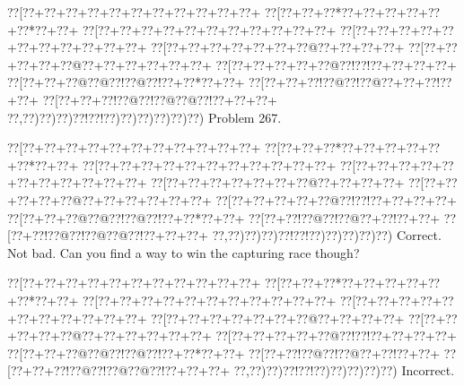 \documentclass[a5paper]{article}
\begin{document}
\begin{center}
{\goo
\0??[\0??+\0??+\0??+\0??+\0??+\0??+\0??+\0??+\0??+\0??+\0??+
\0??[\0??+\0??+\0??*\0??+\0??+\0??+\0??+\0??+\0??*\0??+\0??+
\0??[\0??+\0??+\0??+\0??+\0??+\0??+\0??+\0??+\0??+\0??+\0??+
\0??[\0??+\0??+\0??+\0??+\0??+\0??+\0??+\0??+\0??+\0??+\0??+
\0??[\0??+\0??+\0??+\0??+\0??+\0??+\0??@\0??+\0??+\0??+\0??+
\0??[\0??+\0??+\0??+\0??+\0??@\0??+\0??+\0??+\0??+\0??+\0??+
\0??[\0??+\0??+\0??+\0??+\0??@\0??!\0??!\0??+\0??+\0??+\0??+
\0??[\0??+\0??+\0??@\0??@\0??!\0??@\0??!\0??+\0??*\0??+\0??+
\0??[\0??+\0??+\0??!\0??@\0??!\0??@\0??+\0??+\0??!\0??+\0??+
\0??[\0??+\0??+\0??!\0??@\0??!\0??@\0??@\0??!\0??+\0??+\0??+
\0??,\0??)\0??)\0??)\0??!\0??!\0??)\0??)\0??)\0??)\0??)\0??)
}
Problem 267.

\end{center}
\begin{center}
{\goo
\0??[\0??+\0??+\0??+\0??+\0??+\0??+\0??+\0??+\0??+\0??+\0??+
\0??[\0??+\0??+\0??*\0??+\0??+\0??+\0??+\0??+\0??*\0??+\0??+
\0??[\0??+\0??+\0??+\0??+\0??+\0??+\0??+\0??+\0??+\0??+\0??+
\0??[\0??+\0??+\0??+\0??+\0??+\0??+\0??+\0??+\0??+\0??+\0??+
\0??[\0??+\0??+\0??+\0??+\0??+\0??+\0??@\0??+\0??+\0??+\0??+
\0??[\0??+\0??+\0??+\0??+\0??@\0??+\0??+\0??+\0??+\0??+\0??+
\0??[\0??+\0??+\0??+\0??+\0??@\0??!\0??!\0??+\0??+\0??+\0??+
\0??[\0??+\0??+\0??@\0??@\0??!\0??@\0??!\0??+\0??*\0??+\0??+
\0??[\0??+\0??!\0??@\0??!\0??@\0??+\0??!\0??+\0??+
\0??[\0??+\0??!\0??@\0??!\0??@\0??@\0??!\0??+\0??+\0??+
\0??,\0??)\0??)\0??)\0??!\0??!\0??)\0??)\0??)\0??)\0??)
}
Correct. Not bad. Can you find a way to win the capturing race though?

\end{center}
\begin{center}
{\goo
\0??[\0??+\0??+\0??+\0??+\0??+\0??+\0??+\0??+\0??+\0??+\0??+
\0??[\0??+\0??+\0??*\0??+\0??+\0??+\0??+\0??+\0??*\0??+\0??+
\0??[\0??+\0??+\0??+\0??+\0??+\0??+\0??+\0??+\0??+\0??+\0??+
\0??[\0??+\0??+\0??+\0??+\0??+\0??+\0??+\0??+\0??+\0??+\0??+
\0??[\0??+\0??+\0??+\0??+\0??+\0??+\0??@\0??+\0??+\0??+\0??+
\0??[\0??+\0??+\0??+\0??+\0??@\0??+\0??+\0??+\0??+\0??+\0??+
\0??[\0??+\0??+\0??+\0??+\0??@\0??!\0??!\0??+\0??+\0??+\0??+
\0??[\0??+\0??+\0??@\0??@\0??!\0??@\0??!\0??+\0??*\0??+\0??+
\0??[\0??+\0??!\0??@\0??!\0??@\0??+\0??!\0??+\0??+
\0??[\0??+\0??+\0??!\0??@\0??!\0??@\0??@\0??!\0??+\0??+\0??+
\0??,\0??)\0??)\0??!\0??!\0??)\0??)\0??)\0??)\0??)
}
Incorrect. 

\end{center}
\end{document}
